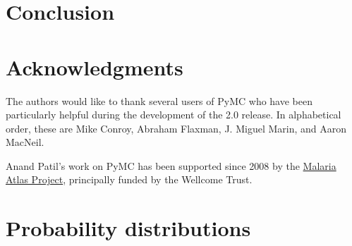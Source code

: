 \documentclass[]{jss_mod}
\begin{document}
\section{Conclusion}
\label{conclusion}


\section[Acknowledgments]{Acknowledgments}
\label{sec:acknowledge}
The authors would like to thank several users of PyMC who have been particularly helpful during the development of the 2.0 release. In alphabetical order, these are Mike Conroy, Abraham Flaxman, J. Miguel Marin, and Aaron MacNeil.

Anand Patil's work on PyMC has been supported since 2008 by the \href{http://www.map.ox.ac.uk}{Malaria Atlas
Project}, principally funded by the Wellcome Trust.

\appendix
% 

\section[Distributions]{Probability distributions}
\label{sec:distributions}


\nocite{Bernardo:1992fk}

\end{document}
